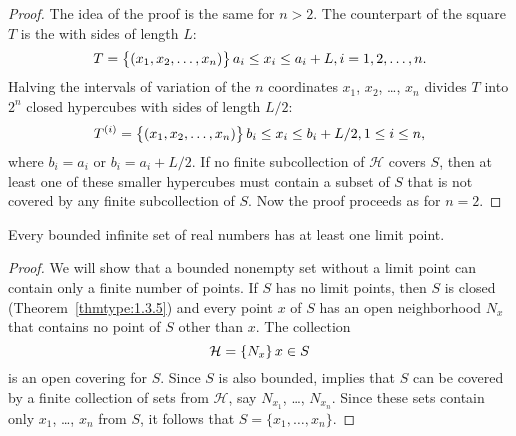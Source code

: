 \begin{proof}
The idea of the proof is the same for $n>2$. The counterpart of the
square $T$ is the  with sides of
length
$L$:
$$
T=\set{(x_1,x_2, \dots,x_n)}{ a_i\le x_i\le a_i+L, i=1,2, \dots, n}.
$$
Halving the intervals of variation of the $n$ coordinates
$x_1$, $x_2$, \dots, $x_n$ divides $T$ into $2^n$ closed hypercubes
with sides of length $L/2$:
$$
T^{(i)}=\set{(x_1,x_2, \dots,x_n)}{b_i\le x_i\le b_i+L/2,
1\le i\le n},
$$
where $b_i=a_i$ or $b_i=a_i+L/2$. If no finite subcollection of ${\mathcal
H}$ covers $S$, then at least one of these smaller hypercubes must
contain a subset of $S$ that is not covered by any finite subcollection
of $S$. Now the proof proceeds as for $n=2$.
\end{proof}




\begin{thm}
 Every bounded infinite set of real numbers has at least one
limit point$.$
\end{thm}

\begin{proof}
 We will show that a bounded nonempty set without a limit point
can contain only a finite number of points. If $S$ has no limit
points, then $S$ is closed (Theorem~\ref{thmtype:1.3.5}) and every point
$x$ of $S$ has an open neighborhood $N_x$ that contains no point of
$S$ other than $x$. The collection
$$
{\mathcal H}=\set{N_x}{x\in S}
$$
is an open covering for $S$. Since $S$ is also bounded, implies that $S$ can be covered by a finite
collection of sets from ${\mathcal H}$, say $N_{x_1}$, \dots, $N_{x_n}$.
Since
these sets contain only $x_1$, \dots, $x_n$ from $S$, it follows that
$S=\{x_1, \dots,x_n\}$.
\end{proof}


